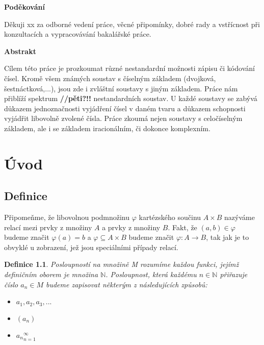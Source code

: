 \documentclass[12pt]{book}
\newtheorem{definice}{Definice}
\begin{document}
\newpage

\begin{center}
	\textbf{Poděkování}

Děkuji xx za odborné vedení práce, věcné připomínky, dobré rady a vstřícnost při
konzultacích a vypracovávání bakalářské práce.
\end{center}

\newpage

\textbf{Abstrakt}

Cílem této práce je prozkoumat různé nestandardní možnosti zápisu či kódování čísel. Kromě všem známých soustav s číselným základem (dvojková, šestnáctková,...), jsou zde i zvláštní soustavy s jiným základem. Práce nám přiblíží spektrum \textbf{//pěti?!!} nestandardních soustav. U každé soustavy se zabývá důkazem jednoznačnosti vyjádření čísel v daném tvaru a důkazem schopnosti vyjádřit libovolně zvolené čísla. Práce zkoumá nejen soustavy s celočíselným základem, ale i se základem iracionálním, či dokonce komplexním.

\newpage

\tableofcontents

\newpage

\chapter{Úvod}
\section{Definice}

\newcommand{\poslbeta}{\{\beta_i\}_{i=1}^{\infty}}
\newcommand{\poslalpha}{\{\alpha_i\}_{i=0}^{\infty}}
\newcommand{\posla}{\{a_i\}_{i=0}^{\infty}}
\newcommand{\poslb}{\{b_i\}_{i=1}^{\infty}}

Připomeňme, že libovolnou podmnožinu $\varphi$ kartézského součinu $A \times B$ nazýváme relací mezi prvky z množiny $A$ a prvky z množiny $B$. Fakt, že $(a,b)\in \varphi$ budeme značit $\varphi(a) = b$ a $\varphi \subseteq A \times B$ budeme značit $\varphi : A \rightarrow B$, tak jak je to obvyklé u zobrazení, jež jsou speciálními případy relací.


\begin{definice}
	Posloupností na množině M rozumíme každou funkci, jejímž definičním oborem je množina $\mathbb{N}$. Posloupnost, která každému $n \in \mathbb{N}$ přiřazuje číslo $a_n \in M$ budeme zapisovat některým z následujících způsobů:
	\begin{itemize}
		\item $a_1, a_2, a_3, ...$
		\item $(a_n)$
		\item ${a_n}_{n=1}^{\infty}$
	\end{itemize}
\end{definice}
\end{document}
